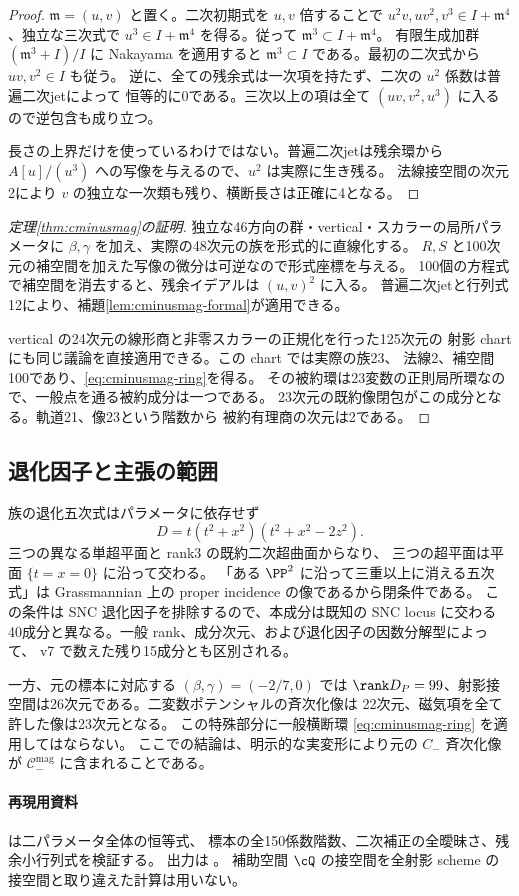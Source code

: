 \begin{proof}
$\mathfrak m=(u,v)$ と置く。二次初期式を $u,v$ 倍することで
$u^2v,uv^2,v^3\in I+\mathfrak m^4$、独立な三次式で
$u^3\in I+\mathfrak m^4$ を得る。従って
$\mathfrak m^3\subset I+\mathfrak m^4$。
有限生成加群 $(\mathfrak m^3+I)/I$ に Nakayama を適用すると
$\mathfrak m^3\subset I$ である。最初の二次式から $uv,v^2\in I$ も従う。
逆に、全ての残余式は一次項を持たず、二次の $u^2$ 係数は普遍二次jetによって
恒等的に0である。三次以上の項は全て $(uv,v^2,u^3)$ に入るので逆包含も成り立つ。

長さの上界だけを使っているわけではない。普遍二次jetは残余環から
$A[u]/(u^3)$ への写像を与えるので、$u^2$ は実際に生き残る。
法線接空間の次元2により $v$ の独立な一次類も残り、横断長さは正確に4となる。
\end{proof}

\begin{proof}[定理\ref{thm:cminusmag}の証明]
独立な46方向の群・vertical・スカラーの局所パラメータに
$\beta,\gamma$ を加え、実際の48次元の族を形式的に直線化する。
$R,S$ と100次元の補空間を加えた写像の微分は可逆なので形式座標を与える。
100個の方程式で補空間を消去すると、残余イデアルは $(u,v)^2$ に入る。
普遍二次jetと行列式12により、補題\ref{lem:cminusmag-formal}が適用できる。

vertical の24次元の線形商と非零スカラーの正規化を行った125次元の
射影 chart にも同じ議論を直接適用できる。この chart では実際の族23、
法線2、補空間100であり、\eqref{eq:cminusmag-ring}を得る。
その被約環は23変数の正則局所環なので、一般点を通る被約成分は一つである。
23次元の既約像閉包がこの成分となる。軌道21、像23という階数から
被約有理商の次元は2である。
\end{proof}

\subsection{退化因子と主張の範囲}

族の退化五次式はパラメータに依存せず
\[
 D=t(t^2+x^2)(t^2+x^2-2z^2).
\]
三つの異なる単超平面と rank3 の既約二次超曲面からなり、
三つの超平面は平面 $\{t=x=0\}$ に沿って交わる。
「ある $\PP^2$ に沿って三重以上に消える五次式」は Grassmannian 上の
proper incidence の像であるから閉条件である。
この条件は SNC 退化因子を排除するので、本成分は既知の SNC locus に交わる
40成分と異なる。一般 rank、成分次元、および退化因子の因数分解型によって、
v7 で数えた残り15成分とも区別される。

一方、元の標本に対応する $(\beta,\gamma)=(-2/7,0)$ では
$\rank D_P=99$、射影接空間は26次元である。二変数ポテンシャルの斉次化像は
22次元、磁気項を全て許した像は23次元となる。
この特殊部分に一般横断環 \eqref{eq:cminusmag-ring} を適用してはならない。
ここでの結論は、明示的な実変形により元の $C_-$ 斉次化像が
$\mathcal C_-^{\mathrm{mag}}$ に含まれることである。

\paragraph{再現用資料}
 は二パラメータ全体の恒等式、
標本の全150係数階数、二次補正の全曖昧さ、残余小行列式を検証する。
出力は 。
補助空間 $\cQ$ の接空間を全射影 scheme の接空間と取り違えた計算は用いない。
